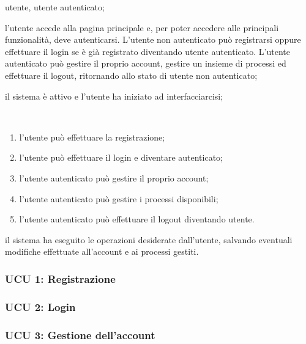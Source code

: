 \begin{description}[leftmargin=0cm]
\item[Attori:] utente, utente autenticato;
\item[Descrizione:] l'utente accede alla pagina principale e, per poter accedere alle principali funzionalità, deve autenticarsi.
L'utente non autenticato può registrarsi oppure effettuare il login se è già registrato diventando utente autenticato.
L'utente autenticato può gestire il proprio account, gestire un insieme di processi ed effettuare il logout, ritornando allo stato di utente non autenticato;
\item[Precondizione:] il sistema è attivo e l'utente ha iniziato ad interfacciarcisi;
\item[Scenario principale:]\
\begin{enumerate}
\item l'utente può effettuare la registrazione;
\item l'utente può effettuare il login e diventare autenticato;
\item l'utente autenticato può gestire il proprio account;
\item l'utente autenticato può gestire i processi disponibili;
\item l'utente autenticato può effettuare il logout diventando utente.
\end{enumerate}
\item[Postcondizione:] il sistema ha eseguito le operazioni desiderate dall'utente, salvando eventuali modifiche effettuate all'account e ai processi gestiti.
\end{description}

\subsubsection{UCU 1: Registrazione}

\subsubsection{UCU 2: Login}

\subsubsection{UCU 3: Gestione dell'account}

